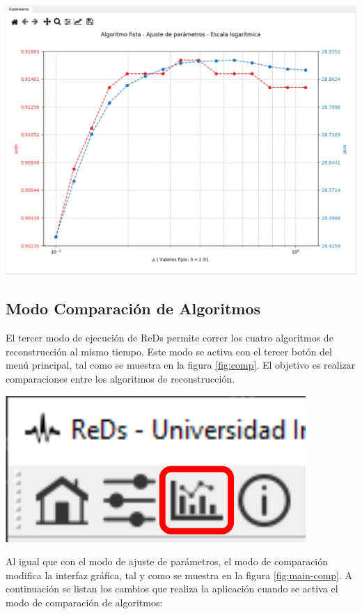 \documentclass[12pt,twoside,letter]{ol-softwaremanual}
\newenvironment{Figure}
  {\par\medskip\noindent\minipage{\linewidth}}
  {\endminipage\par\medskip}
\begin{document}
\begin{Figure}
    \centering
    \includegraphics[width=1\linewidth]{tuning-2.png}
    \label{fig:tuning_2}
\end{Figure}

\subsection{Modo Comparación de Algoritmos}

\begin{multicols}{2}

El tercer modo de ejecución de ReDs permite correr los cuatro algoritmos de reconstrucción al mismo tiempo. Este modo se activa con el tercer botón del menú principal, tal como se muestra en la figura \ref{fig:comp}. El objetivo es realizar comparaciones entre los algoritmos de reconstrucción.
\vfill\null
\columnbreak
\begin{Figure}
	\centering
	\includegraphics[width=0.4\linewidth]{comp-tab.png}
	\label{fig:comp}
\end{Figure}
\end{multicols}
Al igual que con el modo de ajuste de parámetros, el modo de comparación modifica la interfaz gráfica, tal y como se muestra en la figura \ref{fig:main-comp}. A continuación se listan los cambios que realiza la aplicación cuando se activa el modo de comparación de algoritmos:
\end{document}
